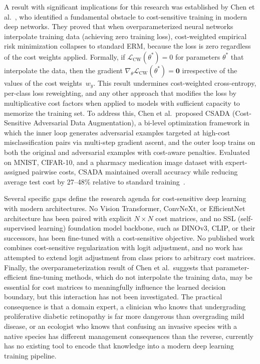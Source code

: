 \documentclass[11pt, letterpaper]{article}
\begin{document}
A result with significant implications for this research was established by Chen
et al.~\cite{chen2025csada}, who identified a fundamental obstacle to
cost-sensitive training in modern deep networks. They proved that when
overparameterized neural networks interpolate training data (achieving zero
training loss), cost-weighted empirical risk minimization collapses to standard
ERM, because the loss is zero regardless of the cost weights applied. Formally,
if $\mathcal{L}_{\mathrm{CW}}(\theta^{*}) = 0$ for parameters $\theta^{*}$
that interpolate the data, then the gradient
$\nabla_\theta \mathcal{L}_{\mathrm{CW}}(\theta^{*}) = \mathbf{0}$ irrespective
of the values of the cost weights~$w_y$. This result undermines cost-weighted
cross-entropy, per-class loss reweighting, and any other approach that modifies
the loss by multiplicative cost factors when applied to models with sufficient
capacity to memorize the training set. To address this, Chen et al.\ proposed
CSADA (Cost-Sensitive Adversarial Data Augmentation), a bi-level optimization
framework in which the inner loop generates adversarial examples targeted at
high-cost misclassification pairs via multi-step gradient ascent, and the outer
loop trains on both the original and adversarial examples with cost-aware
penalties. Evaluated on MNIST, CIFAR-10, and a pharmacy medication image dataset
with expert-assigned pairwise costs, CSADA maintained overall accuracy while
reducing average test cost by 27--48\% relative to standard
training~\cite{chen2025csada}.

Several specific gaps define the research agenda for cost-sensitive deep learning
with modern architectures. No Vision Transformer, ConvNeXt, or EfficientNet
architecture has been paired with explicit $N \times N$ cost matrices, and no SSL (self-supervised learning) foundation model backbone, such as DINOv3, CLIP, or their successors, has been
fine-tuned with a cost-sensitive objective. No published work combines
cost-sensitive regularization with logit adjustment, and no work
has attempted to extend logit adjustment from class priors to arbitrary cost
matrices. Finally, the overparameterization result of Chen et al.\ suggests that
parameter-efficient fine-tuning methods, which do not interpolate the training
data, may be essential for cost matrices to meaningfully influence the learned
decision boundary, but this interaction has not been investigated. The practical
consequence is that a domain expert, a clinician who knows that undergrading
proliferative diabetic retinopathy is far more dangerous than overgrading mild
disease, or an ecologist who knows that confusing an invasive species with a
native species has different management consequences than the reverse, currently
has no existing tool to encode that knowledge into a modern deep learning
training pipeline.
\end{document}
